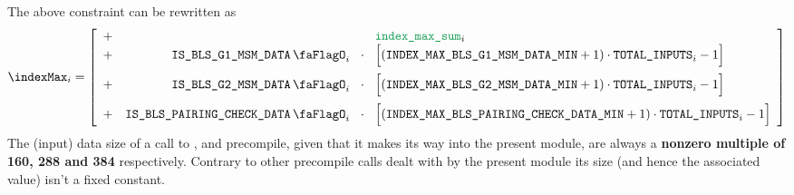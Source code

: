 The above constraint can be rewritten as
\[
	\indexMax_{i}
	=
	\left[ \begin{array}{crcl}
			+ &                              &                   & \locIndexMaxSum_{i}                                                          \\
            + & \isBlsGOneMsmData_       {i} & \!\!\!\cdot\!\!\! & \Big[ (\indexMaxBlsGOneMsmDataMin + 1) \cdot \totalInputs_{i} - 1 \Big]    \vspace{2mm} \\
            + & \isBlsGTwoMsmData_       {i} & \!\!\!\cdot\!\!\! & \Big[ (\indexMaxBlsGTwoMsmDataMin + 1) \cdot \totalInputs_{i} - 1 \Big]     \vspace{2mm} \\
			+ & \isBlsPairingCheckData_ {i}  & \!\!\!\cdot\!\!\! & \Big[ (\indexMaxBlsPairingCheckDataMin + 1) \cdot \totalInputs_{i} - 1 \Big] \\
		\end{array} \right]
\]
\saNote{} The (input) data size of a call to ,  and  precompile, given that it makes its way into the present module, are always a \textbf{nonzero multiple of 160, 288 and 384} respectively. Contrary to other precompile calls dealt with by the present module its size (and hence the associated \indexMax{} value) isn't a fixed constant.